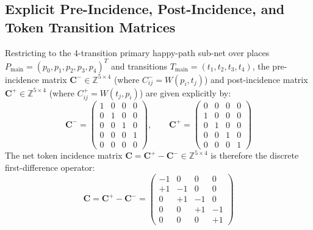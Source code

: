 \documentclass[10pt,twoside,openany]{book}
\theoremstyle{plain}
\theoremstyle{definition}
\theoremstyle{remark}
\newcommand{\Z}{\mathbb{Z}}
\begin{document}
\subsection{Explicit Pre-Incidence, Post-Incidence, and Token Transition Matrices}
Restricting to the 4-transition primary happy-path sub-net over places $P_{\mathrm{main}} = (p_0, p_1, p_2, p_3, p_4)^T$ and transitions $T_{\mathrm{main}} = (t_1, t_2, t_3, t_4)$, the pre-incidence matrix $\mathbf{C}^- \in \Z^{5 \times 4}$ (where $C^-_{ij} = W(p_i, t_j)$) and post-incidence matrix $\mathbf{C}^+ \in \Z^{5 \times 4}$ (where $C^+_{ij} = W(t_j, p_i)$) are given explicitly by:
\begin{equation}
\mathbf{C}^- = \begin{pmatrix}
1 & 0 & 0 & 0 \\
0 & 1 & 0 & 0 \\
0 & 0 & 1 & 0 \\
0 & 0 & 0 & 1 \\
0 & 0 & 0 & 0
\end{pmatrix}, \qquad
\mathbf{C}^+ = \begin{pmatrix}
0 & 0 & 0 & 0 \\
1 & 0 & 0 & 0 \\
0 & 1 & 0 & 0 \\
0 & 0 & 1 & 0 \\
0 & 0 & 0 & 1
\end{pmatrix}
\end{equation}
The net token incidence matrix $\mathbf{C} = \mathbf{C}^+ - \mathbf{C}^- \in \Z^{5 \times 4}$ is therefore the discrete first-difference operator:
\begin{equation}
\mathbf{C} = \mathbf{C}^+ - \mathbf{C}^- = \begin{pmatrix}
-1 & 0 & 0 & 0 \\
+1 & -1 & 0 & 0 \\
0 & +1 & -1 & 0 \\
0 & 0 & +1 & -1 \\
0 & 0 & 0 & +1
\end{pmatrix}
\end{equation}
\end{document}
